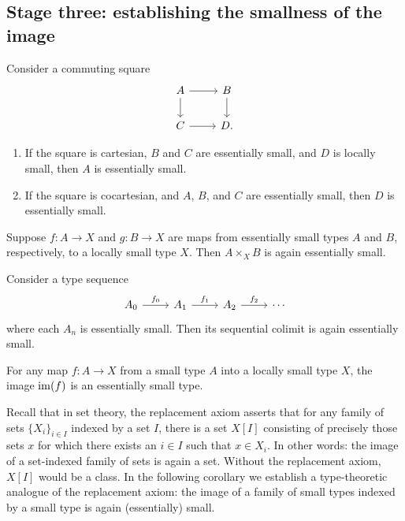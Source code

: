 \subsection{Stage three: establishing the smallness of the image}
\begin{lem}
Consider a commuting square
\begin{equation*}
\begin{tikzcd}
A \arrow[r] \arrow[d] & B \arrow[d] \\
C \arrow[r] & D.
\end{tikzcd}
\end{equation*}
\begin{enumerate}
\item If the square is cartesian, $B$ and $C$ are essentially small, and $D$ is locally small, then $A$ is essentially small.
\item If the square is cocartesian, and $A$, $B$, and $C$ are essentially small, then $D$ is essentially small. 
\end{enumerate}
\end{lem}

\begin{cor}
Suppose $f:A\to X$ and $g:B\to X$ are maps from essentially small types $A$ and $B$, respectively, to a locally small type $X$. Then $A\times_X B$ is again essentially small. 
\end{cor}

\begin{lem}
Consider a type sequence
\begin{equation*}
\begin{tikzcd}
A_0 \arrow[r,"f_0"] & A_1 \arrow[r,"f_1"] & A_2 \arrow[r,"f_2"] & \cdots
\end{tikzcd}
\end{equation*}
where each $A_n$ is essentially small. Then its sequential colimit is again essentially small. 
\end{lem}

\begin{thm}
For any map $f:A\to X$ from a small type $A$ into a locally small type $X$, the image $\operatorname{im}(f)$ is an essentially small type.
\end{thm}

Recall that in set theory, the replacement axiom asserts that for any family of sets $\{X_i\}_{i\in I}$ indexed by a set $I$, there is a set $X[I]$ consisting of precisely those sets $x$ for which there exists an $i\in I$ such that $x\in X_i$. In other words: the image of a set-indexed family of sets is again a set. Without the replacement axiom, $X[I]$ would be a class. In the following corollary we establish a type-theoretic analogue of the replacement axiom: the image of a family of small types indexed by a small type is again (essentially) small.

